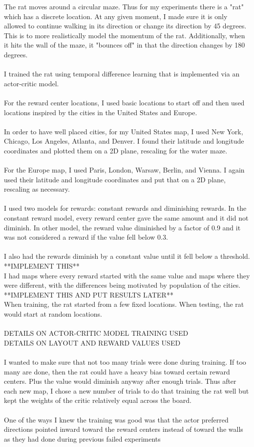 \documentclass[conference]{IEEEtran}
\begin{document}
The rat moves around a circular maze. Thus for my experiments there is a "rat" which has a discrete location. At any given moment, I made sure it is only allowed to continue walking in its direction or change its direction by 45 degrees. This is to more realistically model the momentum of the rat. Additionally, when it hits the wall of the maze, it "bounces off" in that the direction changes by 180 degrees.\\
\\
I trained the rat using temporal difference learning that is implemented via an actor-critic model. \\
\\
For the reward center locations, I used basic locations to start off and then used locations inspired by the cities in the United States and Europe. \\
\\
In order to have well placed cities, for my United States map, I used New York, Chicago, Los Angeles, Atlanta, and Denver. I found their latitude and longitude coordinates and plotted them on a 2D plane, rescaling for the water maze. \\
\\
For the Europe map, I used Paris, London, Warsaw, Berlin, and Vienna. I again used their latitude and longitude coordinates and put that on a 2D plane, rescaling as necessary. \\
\\
I used two models for rewards: constant rewards and diminishing rewards. In the constant reward model, every reward center gave the same amount and it did not diminish. In other model, the reward value diminished by a factor of 0.9 and it was not considered a reward if the value fell below 0.3. \\
\\
I also had the rewards diminish by a constant value until it fell below a threshold. **IMPLEMENT THIS**
\\
I had maps where every reward started with the same value and maps where they were different, with the differences being motivated by population of the cities. **IMPLEMENT THIS AND PUT RESULTS LATER**
\\
When training, the rat started from a few fixed locations. When testing, the rat would start at random locations. \\
\\
DETAILS ON ACTOR-CRITIC MODEL TRAINING USED\\
DETAILS ON LAYOUT AND REWARD VALUES USED\\
\\
I wanted to make sure that not too many trials were done during training. If too many are done, then the rat could have a heavy bias toward certain reward centers. Plus the value would diminish anyway after enough trials. Thus after each new map, I chose a new number of trials to do that training the rat well but kept the weights of the critic relatively equal across the board. \\
\\
One of the ways I knew the training was good was that the actor preferred directions pointed inward toward the reward centers instead of toward the walls as they had done during previous failed experiments
\end{document}
